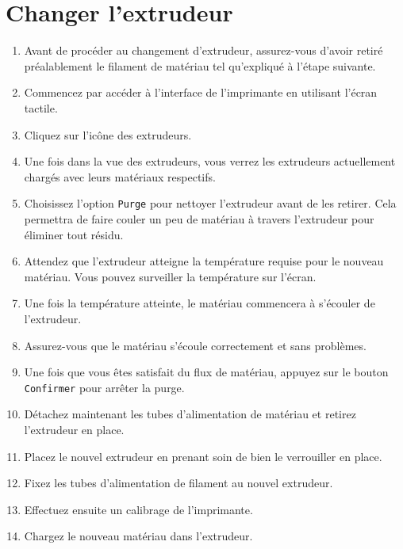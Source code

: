 \documentclass{Thesis}
\begin{document}
\section{Changer l'extrudeur}
\begin{enumerate}
    \item Avant de procéder au changement d'extrudeur, assurez-vous d'avoir retiré préalablement le filament de matériau tel qu'expliqué à l'étape suivante.
    \item Commencez par accéder à l'interface de l'imprimante en utilisant l'écran tactile.
    \item Cliquez sur l'icône des extrudeurs.
    \item Une fois dans la vue des extrudeurs, vous verrez les extrudeurs actuellement chargés avec leurs matériaux respectifs.
    \item Choisissez l'option \texttt{Purge} pour nettoyer l'extrudeur avant de les retirer. Cela permettra de faire couler un peu de matériau à travers l'extrudeur pour éliminer tout résidu.
    \item Attendez que l'extrudeur atteigne la température requise pour le nouveau matériau. Vous pouvez surveiller la température sur l'écran.
    \item Une fois la température atteinte, le matériau commencera à s'écouler de l'extrudeur.
    \item Assurez-vous que le matériau s'écoule correctement et sans problèmes.
    \item Une fois que vous êtes satisfait du flux de matériau, appuyez sur le bouton \texttt{Confirmer} pour arrêter la purge.
    \item Détachez maintenant les tubes d'alimentation de matériau et retirez l'extrudeur en place.
    \item Placez le nouvel extrudeur en prenant soin de bien le verrouiller en place.
    \item Fixez les tubes d'alimentation de filament au nouvel extrudeur.
    \item Effectuez ensuite un calibrage de l'imprimante.
    \item Chargez le nouveau matériau dans l'extrudeur.
\end{enumerate}
\end{document}

